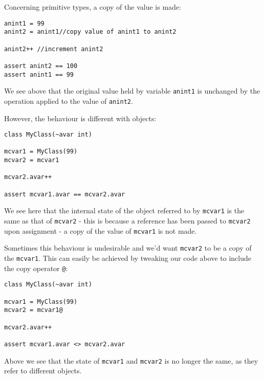 \documentclass[conc-doc]{subfiles}
\begin{document}
Concerning primitive types, a copy of the value is made:
\begin{lstlisting}
anint1 = 99
anint2 = anint1//copy value of anint1 to anint2

anint2++ //increment anint2

assert anint2 == 100
assert anint1 == 99
\end{lstlisting}

We see above that the original value held by variable \lstinline{anint1} is unchanged by the operation applied to the value of \lstinline{anint2}.

However, the behaviour is different with objects:
\begin{lstlisting}
class MyClass(~avar int)

mcvar1 = MyClass(99)
mcvar2 = mcvar1

mcvar2.avar++

assert mcvar1.avar == mcvar2.avar
\end{lstlisting}

We see here that the internal state of the object referred to by \lstinline{mcvar1} is the same as that of \lstinline{mcvar2} - this is because a reference has been passed to \lstinline{mcvar2} upon assignment - a copy of the value of \lstinline{mcvar1} is not made.

Sometimes this behaviour is undesirable and we'd want \lstinline{mcvar2} to be a copy of the \lstinline{mcvar1}. This can easily be achieved by tweaking our code above to include the copy operator \lstinline{@}:

\begin{lstlisting}
class MyClass(~avar int)

mcvar1 = MyClass(99)
mcvar2 = mcvar1@

mcvar2.avar++

assert mcvar1.avar <> mcvar2.avar
\end{lstlisting}

Above we see that the state of \lstinline{mcvar1} and \lstinline{mcvar2} is no longer the same, as they refer to different objects.
\end{document}

